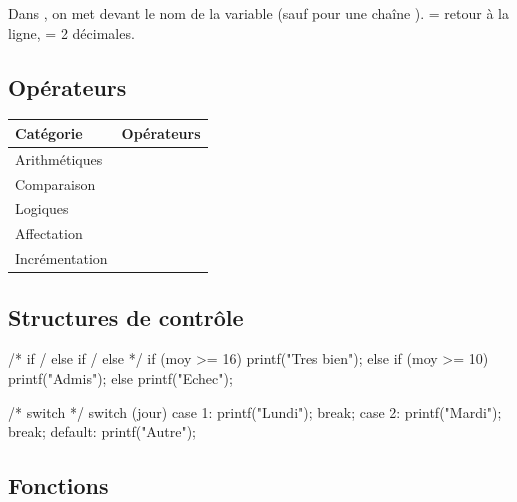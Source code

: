 \begin{attention}
Dans , on met \code{\&} devant le nom de la variable (sauf pour une
chaîne ).  = retour à la ligne,
 = 2 décimales.
\end{attention}

\subsection{Opérateurs}

\begin{center}\small
\begin{tabular}{@{}ll@{}}
\toprule
\textbf{Catégorie} & \textbf{Opérateurs}\\
\midrule
Arithmétiques & \code{+ - * / \%}\\
Comparaison   & \code{== != < > <= >=}\\
Logiques      & \code{\&\& || !}\\
Affectation   & \code{= += -= *= /=}\\
Incrémentation & \code{++ -{}-}\\
\bottomrule
\end{tabular}
\end{center}

\subsection{Structures de contrôle}

\begin{codec}
/* if / else if / else */
if (moy >= 16)       printf("Tres bien");
else if (moy >= 10)  printf("Admis");
else                 printf("Echec");

/* switch */
switch (jour) {
    case 1: printf("Lundi"); break;
    case 2: printf("Mardi"); break;
    default: printf("Autre");
}
\end{codec}


\subsection{Fonctions}

